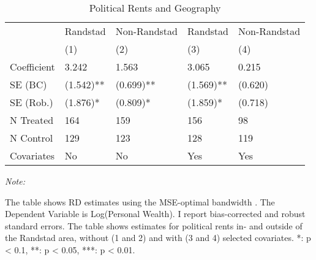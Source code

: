 \begin{table}[!h]

\caption{\label{tab:results_randstad}Political Rents and Geography}
\centering
\fontsize{10}{12}\selectfont
\begin{threeparttable}
\begin{tabular}[t]{lllll}
\toprule
\multicolumn{1}{c}{ } & \multicolumn{1}{c}{Randstad} & \multicolumn{1}{c}{Non-Randstad} & \multicolumn{1}{c}{Randstad} & \multicolumn{1}{c}{Non-Randstad} \\
\cmidrule(l{3pt}r{3pt}){2-2} \cmidrule(l{3pt}r{3pt}){3-3} \cmidrule(l{3pt}r{3pt}){4-4} \cmidrule(l{3pt}r{3pt}){5-5}
  & (1) & (2) & (3) & (4)\\
\midrule
Coefficient & 3.242 & 1.563 & 3.065 & 0.215\\
SE (BC) & (1.542)** & (0.699)** & (1.569)** & (0.620)\\
SE (Rob.) & (1.876)* & (0.809)* & (1.859)* & (0.718)\\
N Treated & 164 & 159 & 156 & 98\\
N Control & 129 & 123 & 128 & 119\\
Covariates & No & No & Yes & Yes\\
\bottomrule
\end{tabular}
\begin{tablenotes}[para]
\item \textit{Note: } 
\item The table shows RD estimates using the MSE-optimal bandwidth \citep{cattaneo2019practical}. The Dependent Variable is Log(Personal Wealth). I report bias-corrected and robust standard errors. The table shows estimates for political rents in- and outside of the Randstad area, without (1 and 2) and with (3 and 4) selected covariates. *: p < 0.1, **: p < 0.05, ***: p < 0.01.
\end{tablenotes}
\end{threeparttable}
\end{table}
